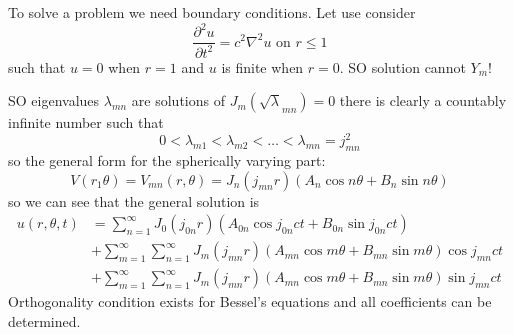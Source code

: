 \documentclass[a4paper]{article}
\begin{document}
To solve a problem we need boundary conditions. Let use consider
\[
  \frac{\partial^2 u}{\partial t^2} = c^2\nabla^2u \text{ on } r\leq1
\]
such that \(u=0\) when \(r=1\) and \(u\) is finite when \(r=0\). SO solution cannot \(Y_m\)!

SO eigenvalues \(\lambda_{mn}\) are solutions of \(J_m(\sqrt\lambda_{mn})=0\) there is clearly a countably infinite number such that
\[
  0 < \lambda_{m1} < \lambda_{m2} < \dots < \lambda_{mn} = j_{mn}^2
\]
so the general form for the spherically varying part:
\[
  V(r_1\theta) = V_{mn}(r,\theta) = J_n(j_{mn}r) (A_n\cos n\theta + B_n \sin n\theta)
\]
so we can see that the general solution is
\begin{align*}
  u(r,\theta,t) &= \sum_{n=1}^{\infty}J_0(j_{0n}r) (A_{0n}\cos j_{0n}ct + B_{0n}\sin j_{0n}ct) \\
                &+ \sum_{m=1}^{\infty} \sum_{n=1}^{\infty} J_m(j_{mn}r) (A_{mn}\cos m\theta + B_{mn} \sin m\theta ) \cos j_{mn}ct \\
                &+ \sum_{m=1}^{\infty} \sum_{n=1}^{\infty}J_m(j_{mn}r) (A_{mn}\cos m\theta + B_{mn} \sin m\theta ) \sin j_{mn}ct
\end{align*}
Orthogonality condition exists for Bessel's equations and all coefficients can be determined.
\end{document}
